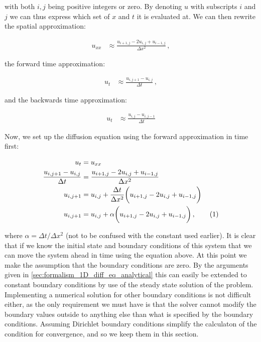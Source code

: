 \documentclass[reprint,english,notitlepage]{revtex4-1}  %
\newcommand\numberthis{\addtocounter{equation}{1}\tag{\theequation}}
\begin{document}
with both $i,j$ being positive integers or zero. By denoting $u$ with subscripts $i$ and $j$ we can thus express which set of $x$ and $t$ it is evaluated at. We can then rewrite the spatial approximation:

\begin{align*}
u_{xx} &\approx \frac{u_{i+1,j} - 2u_{i,j} + u_{i-1,j}}{\Delta x^2} \, ,
\end{align*}

the forward time approximation:

\begin{align*}
u_t &\approx \frac{u_{i,j+1} - u_{i,j}}{\Delta t} \, ,
\end{align*}

and the backwards time approximation:

\begin{align*}
u_t &\approx \frac{u_{i,j}- u_{i,j-1}}{\Delta t}
\end{align*}

Now, we set up the diffusion equation using the forward approximation in time first:

\begin{align*}
u_t &= u_{xx} \\
\frac{u_{i,j+1} - u_{i,j}}{\Delta t} &= \frac{u_{i+1,j} - 2u_{i,j} + u_{i-1,j}}{\Delta x^2}  \\
u_{i,j+1} &= u_{i,j} + \frac{\Delta t}{\Delta x^2} \bigg( u_{i+1,j} - 2u_{i,j} + u_{i-1,j} \bigg) \\
u_{i,j+1} &= u_{i,j} + \alpha \bigg( u_{i+1,j} - 2u_{i,j} + u_{i-1,j} \bigg) \, ,\numberthis \label{eq:forward_euler_method}
\end{align*}

where $\alpha = \Delta t /\Delta x^2$ (not to be confused with the constant used earlier). It is clear that if we know the initial state and boundary conditions of this system that we can move the system ahead in time using the equation above. At this point we make the assumption that the boundary conditions are zero. By the arguments given in \ref{sec:formalism_1D_diff_eq_analytical} this can easily be extended to constant boundary conditions by use of the steady state solution of the problem. Implementing a numerical solution for other boundary conditions is not difficult either, as the only requirement we must have is that the solver cannot modify the boundary values outside to anything else than what is specified by the boundary conditions. Assuming Dirichlet boundary conditions simplify the calculaton of the condition for convergence, and so we keep them in this section.
\end{document}
